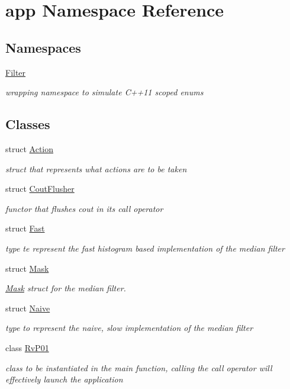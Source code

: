 \hypertarget{namespaceapp}{}\section{app Namespace Reference}
\label{namespaceapp}
\subsection*{Namespaces}
\begin{DoxyCompactItemize}
\item 
 \hyperlink{namespaceapp_1_1_filter}{Filter}
\begin{DoxyCompactList}\small\item\em wrapping namespace to simulate C++11 scoped enums \end{DoxyCompactList}\end{DoxyCompactItemize}
\subsection*{Classes}
\begin{DoxyCompactItemize}
\item 
struct \hyperlink{structapp_1_1_action}{Action}
\begin{DoxyCompactList}\small\item\em struct that represents what actions are to be taken \end{DoxyCompactList}\item 
struct \hyperlink{structapp_1_1_cout_flusher}{Cout\+Flusher}
\begin{DoxyCompactList}\small\item\em functor that flushes cout in its call operator \end{DoxyCompactList}\item 
struct \hyperlink{structapp_1_1_fast}{Fast}
\begin{DoxyCompactList}\small\item\em type te represent the fast histogram based implementation of the median filter \end{DoxyCompactList}\item 
struct \hyperlink{structapp_1_1_mask}{Mask}
\begin{DoxyCompactList}\small\item\em \hyperlink{structapp_1_1_mask}{Mask} struct for the median filter. \end{DoxyCompactList}\item 
struct \hyperlink{structapp_1_1_naive}{Naive}
\begin{DoxyCompactList}\small\item\em type to represent the \textquotesingle{}naive\textquotesingle{}, slow implementation of the median filter \end{DoxyCompactList}\item 
class \hyperlink{classapp_1_1_rv_p01}{Rv\+P01}
\begin{DoxyCompactList}\small\item\em class to be instantiated in the main function, calling the call operator will effectively launch the application \end{DoxyCompactList}\end{DoxyCompactItemize}
